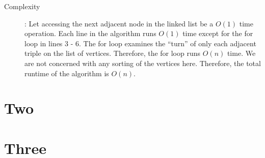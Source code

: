 \documentclass [12pt]{article}
\begin{document}
\begin{enumerate}[label=(\alph*)]
\begin{description}
                \item[Complexity]: Let accessing the next adjacent node in the linked list be a $O(1)$ time operation. Each line in the algorithm runs $O(1)$ time except for the for loop in lines 3 - 6. The for loop examines the ``turn'' of only each adjacent triple on the list of vertices. Therefore, the for loop runs $O(n)$ time. We are not concerned with any sorting of the vertices here. Therefore, the total runtime of the algorithm is $O(n)$.
            \end{description}

        \end{enumerate}

    \pagebreak



    \section{Two}
    \label{sec:two}


    \pagebreak


    \section{Three}
    \label{sec:three}


    \pagebreak


\end{document}
